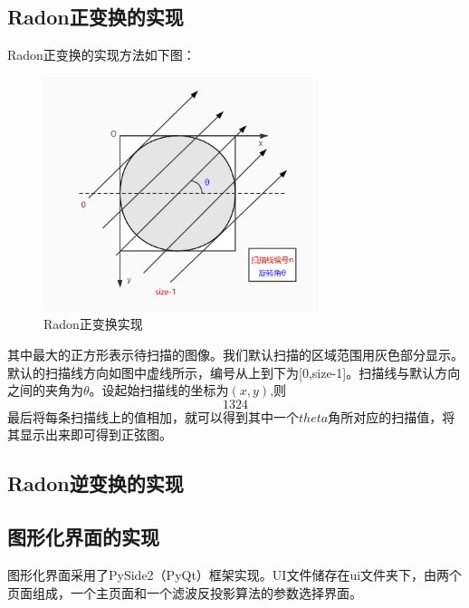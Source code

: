\documentclass[UTF8]{ctexart}
\begin{document}
\subsection{Radon正变换的实现}
Radon正变换的实现方法如下图：
\begin{figure}[H]
    \centering
    \includegraphics[width=0.7\textwidth]{../image/radon.jpg}
    \caption{Radon正变换实现}
    \label{fig Radon}
\end{figure}
其中最大的正方形表示待扫描的图像。我们默认扫描的区域范围用灰色部分显示。默认的扫描线方向如图中虚线所示，编号从上到下为[0,size-1]。扫描线与默认方向之间的夹角为$\theta$。设起始扫描线的坐标为$(x,y)$,则
\begin{equation}
    1324
\end{equation}
最后将每条扫描线上的值相加，就可以得到其中一个$theta$角所对应的扫描值，将其显示出来即可得到正弦图。

\subsection{Radon逆变换的实现}

\subsection{图形化界面的实现}

图形化界面采用了PySide2（PyQt）框架实现。UI文件储存在ui文件夹下，由两个页面组成，一个主页面和一个滤波反投影算法的参数选择界面。
\end{document}
